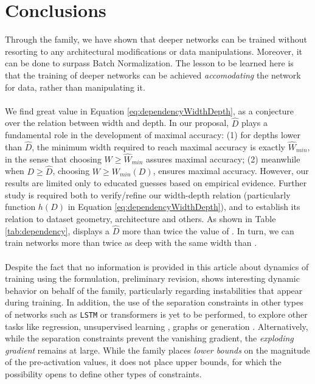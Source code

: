 \section{Conclusions}\label{sec:conclusions}
Through the \SepConstraint family, we have shown that deeper networks can be trained without resorting to any architectural modifications or data manipulations. Moreover, it can be done to surpass Batch Normalization. The lesson to be learned here is that the training of deeper networks can be achieved \emph{accomodating} the network for data, rather than manipulating it.
\\\\
We find great value in Equation \ref{eq:dependencyWidthDepth}, as a conjecture over the relation between width and depth. In our proposal, $\hat{D}$ plays a fundamental role in the development of maximal accuracy: (1) for depths lower than $\hat{D}$, the minimum width required to reach maximal accuracy is exactly $\hat{W}_{min}$, in the sense that choosing $W\geq\hat{W}_{min}$ assures maximal accuracy; (2) meanwhile when  $D\geq \hat{D}$, choosing $W\geq W_{min}(D)$, ensures maximal accuracy. However, our results are limited only to educated guesses based on empirical evidence. Further study is required both to verify/refine our width-depth relation (particularly function $h(D)$ in Equation \ref{eq:dependencyWidthDepth}), and to establish its relation to dataset geometry, architecture and others. As shown in Table \ref{tab:dependency}, \SepUnitPoint displays a $\hat{D}$ more than twice the value of \ReLUBN. In turn, we can train networks more than twice as deep with the same width than \ReLUBN. 
\\\\
Despite the fact that no information is provided in this article about dynamics of training using the \SepConstraint formulation, preliminary revision, shows interesting dynamic behavior on behalf of the \SepConstraint family, particularly regarding instabilities that appear during training. In addition, the use of the separation constraints in other types of networks such as \texttt{LSTM} \cite{lstm} or transformers \cite{transformer}\cite{transformer2} is yet to be performed, to explore other tasks like regression, unsupervised learning \cite{embedding}, graphs \cite{graph} or generation \cite{gan,vae}. Alternatively, while the separation constraints prevent the vanishing gradient, the \emph{exploding gradient} remains at large. While the \SepConstraint family places \emph{lower bounds} on the magnitude of the pre-activation values, it does not place upper bounds, for which the possibility opens to define other types of constraints. 
\\\\







